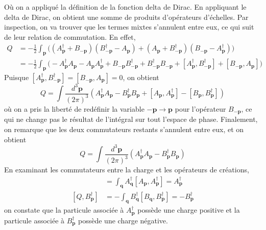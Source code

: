 \documentclass{article}
\numberwithin{equation}{section}
\begin{document}
Où on a appliqué la définition de la fonction delta de Dirac. En appliquant le delta de Dirac, on obtient une 
somme de produits d'opérateurs d'échelles. Par inspection, on va trouver que les termes mixtes s'annulent entre eux, ce qui 
suit de leur relation de commutation. En effet,
\begin{align*}
Q        
&= 
-\frac{1}{2} 
                \int_{\mathbf{p}} \big((A^{\dagger}_{\mathbf{p}} + B_{-\mathbf{p}})(B^{\dagger}_{-\mathbf{p}} - A_{\mathbf{p}}) 
                + (A_{\mathbf{p}} + B^{\dagger}_{-\mathbf{p}})(B_{-\mathbf{p}} - A^{\dagger}_{\mathbf{p}}) \big) \\
&= 
        -\frac{1}{2} 
        \int_{\mathbf{p}} \big(-A^{\dagger}_{\mathbf{p}}A_{\mathbf{p}} - A_{\mathbf{p}}A^{\dagger}_{\mathbf{p}} + B_{-\mathbf{p}}B^{\dagger}_{-\mathbf{p}} + B^{\dagger}_{-\mathbf{p}}B_{-\mathbf{p}} + [A^{\dagger}_{\mathbf{p}}, B^{\dagger}_{-\mathbf{p}}] + [B_{-\mathbf{p}}, A_{\mathbf{p}}])
\end{align*}
Puisque $[A^{\dagger}_{\mathbf{p}}, B^{\dagger}_{-\mathbf{p}}] = [B_{-\mathbf{p}}, A_{\mathbf{p}}] = 0$, on obtient
\begin{equation}
        Q =  \int \frac{d^{3}\mathbf{p}}{(2 \pi)^{3}} ( A^{\dagger}_{\mathbf{p}}A_{\mathbf{p}} - B^{\dagger}_{\mathbf{p}}B_{\mathbf{p}} 
        + [A_{\mathbf{p}}, A^{\dagger}_{\mathbf{p}}] - [B_{\mathbf{p}}, B^{\dagger}_{\mathbf{p}}])
\end{equation} 
où on a pris la liberté de redéfinir la variable $-\mathbf{p} \rightarrow \mathbf{p}$ pour l'opérateur $B_{-\mathbf{p}}$, ce qui ne change 
pas le résultat de l'intégral sur tout l'espace de phase. Finalement, on remarque que les deux 
commutateurs restants s'annulent entre eux, et on obtient
\begin{equation}
        \boxed{Q = \int \frac{d^{3}\mathbf{p}}{(2 \pi)^{3}} (A^{\dagger}_{\mathbf{p}}A_{\mathbf{p}} - B^{\dagger}_{\mathbf{p}}B_{\mathbf{p}})}
\end{equation} 
En examinant les commutateurs entre la charge et les opérateurs de créations, 
\begin{align}
        [Q, A^{\dagger}_{\mathbf{p}}] &= \int_{\mathbf{q}} A^{\dagger}_{\mathbf{q}}[A_{\mathbf{p}}, A^{\dagger}_{\mathbf{p}}] = A^{\dagger}_{\mathbf{p}} \\
        [Q, B_{\mathbf{p}}^{\dagger}] &= - \int_{\mathbf{q}} B^{\dagger}_{\mathbf{q}}[B_{\mathbf{q}}, B^{\dagger}_{\mathbf{p}}] = -B^{\dagger}_{\mathbf{p}}
\end{align} 
on constate que la particule associée à $A^{\dagger}_{\mathbf{p}}$ possède une charge positive et la particule associée à 
$B^{\dagger}_{\mathbf{p}}$ possède une charge négative.
\end{document}
